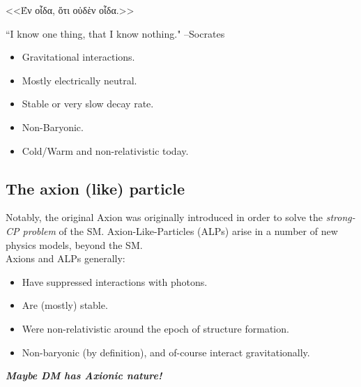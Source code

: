 \documentclass[10pt,utf8,compress,xcolor=dvipsnames]{beamer}
\begin{document}
\begin{frame}{\insertsubsectionhead}
	\begin{center}
		\begin{otherlanguage}{greek}
			<<Έν οἶδα, ὅτι οὐδὲν οἶδα.>>\\
		\end{otherlanguage}		
	``I know one thing,  that I know nothing."
	\flushright --Socrates \pause
	\end{center}

	\begin{itemize}
		\item Gravitational interactions.
		\item Mostly electrically neutral.
		\item Stable or very slow decay rate. 
		\item Non-Baryonic.
		\item Cold/Warm and non-relativistic today.
	\end{itemize}
	
\end{frame}

\subsection{The axion (like) particle}
\begin{frame}{\insertsubsectionhead}
%
Notably, the original Axion was originally introduced in order to solve the {\em strong-CP problem} of the SM.
Axion-Like-Particles (ALPs) arise in a number of new physics models, beyond the SM.  \\[0.5cm]

Axions and ALPs generally:
%
	\begin{itemize}
	\item Have suppressed interactions with photons.
	\item Are (mostly) stable. 
	\item Were non-relativistic around the epoch of structure formation. \pause
	\item Non-baryonic (by definition), and of-course interact gravitationally.\\[1cm]
\end{itemize}

\pause
\begin{center}
	{\bf \em Maybe DM has Axionic nature!}	
\end{center}

\end{frame}
\end{document}
